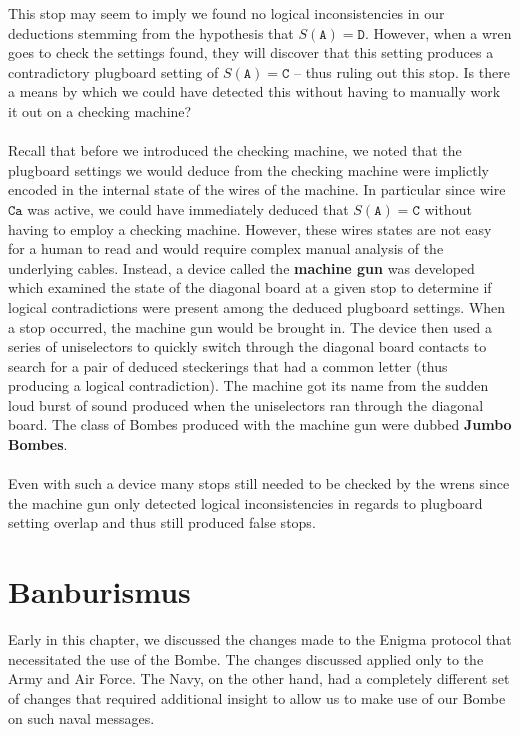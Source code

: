 This stop may seem to imply we found no logical inconsistencies in our
deductions stemming from the hypothesis that $S(\texttt{A}) =
\texttt{D}$. However, when a wren goes to check the settings found,
they will discover that this setting produces a contradictory
plugboard setting of $S(\texttt{A}) = \texttt{C}$ -- thus ruling out
this stop. Is there a means by which we could have detected this
without having to manually work it out on a checking machine?
\\\\Recall that before we introduced the checking machine, we noted
that the plugboard settings we would deduce from the checking machine
were implictly encoded in the internal state of the wires of the
machine. In particular since wire $\texttt{Ca}$ was active, we could
have immediately deduced that $S(\texttt{A})= \texttt{C}$ without
having to employ a checking machine. However, these wires states are
not easy for a human to read and would require complex manual
analysis of the underlying cables. Instead, a device called the
{\bf{machine gun}} was developed which examined the state of the
diagonal board at a given stop to determine if logical contradictions
were present among the deduced plugboard settings. When a stop
occurred, the machine gun would be brought in. The device then used a
series of uniselectors to quickly switch through the diagonal board
contacts to search for a pair of deduced steckerings that had a
common letter (thus producing a logical contradiction). The machine
got its name from the sudden loud burst of sound produced when the
uniselectors ran through the diagonal board. The class of Bombes
produced with the machine gun were dubbed {\bf{Jumbo Bombes}}.
\\\\Even with such a device many stops still needed to be checked by
the wrens since the machine gun only detected logical inconsistencies
in regards to plugboard setting overlap and thus still produced false stops.

\section{Banburismus}
Early in this chapter, we discussed the changes made to the Enigma
protocol that necessitated the use of the Bombe. The changes
discussed applied only to the Army and Air Force. The Navy, on the
other hand, had a completely different set of changes that required
additional insight to allow us to make use of our Bombe on such naval messages.

